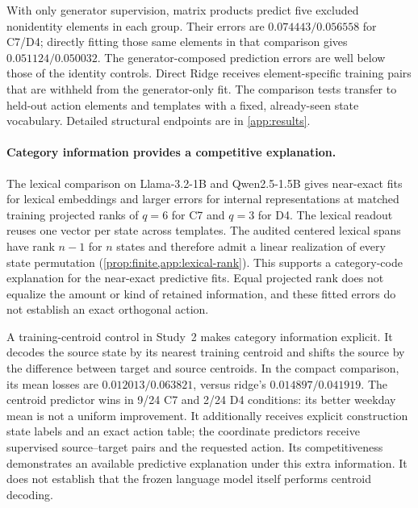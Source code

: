 With only generator supervision, matrix products predict five excluded nonidentity elements in each group. Their errors are $0.074443/0.056558$ for C7/D4; directly fitting those same elements in that comparison gives $0.051124/0.050032$. The generator-composed prediction errors are well below those of the identity controls. Direct Ridge receives element-specific training pairs that are withheld from the generator-only fit. The comparison tests transfer to held-out action elements and templates with a fixed, already-seen state vocabulary. Detailed structural endpoints are in \cref{app:results}.

\paragraph{Category information provides a competitive explanation.}
The lexical comparison on Llama-3.2-1B and Qwen2.5-1.5B gives near-exact fits for lexical embeddings and larger errors for internal representations at matched training projected ranks of $q=6$ for C7 and $q=3$ for D4. The lexical readout reuses one vector per state across templates. The audited centered lexical spans have rank $n-1$ for $n$ states and therefore admit a linear realization of every state permutation (\cref{prop:finite,app:lexical-rank}). This supports a category-code explanation for the near-exact predictive fits. Equal projected rank does not equalize the amount or kind of retained information, and these fitted errors do not establish an exact orthogonal action.

A training-centroid control in Study~2 makes category information explicit. It decodes the source state by its nearest training centroid and shifts the source by the difference between target and source centroids. In the compact comparison, its mean losses are $0.012013/0.063821$, versus ridge's $0.014897/0.041919$. The centroid predictor wins in 9/24 C7 and 2/24 D4 conditions: its better weekday mean is not a uniform improvement. It additionally receives explicit construction state labels and an exact action table; the coordinate predictors receive supervised source--target pairs and the requested action. Its competitiveness demonstrates an available predictive explanation under this extra information. It does not establish that the frozen language model itself performs centroid decoding.

